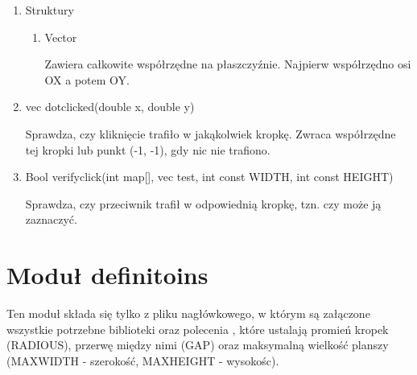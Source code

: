 \documentclass{article}
\begin{document}
\begin{enumerate}

\item Struktury

\begin{enumerate}

\item Vector

Zawiera całkowite współrzędne na płaszczyźnie. Najpierw współrzędno osi OX a potem OY.

\end{enumerate}

\item vec dot\textunderscore clicked(double x, double y)

Sprawdza, czy kliknięcie trafiło w jakąkolwiek kropkę. Zwraca współrzędne tej kropki lub punkt (-1, -1), gdy nic nie trafiono.

\item \textunderscore Bool verify\textunderscore click(int map[], vec test, int const WIDTH, int const HEIGHT)

Sprawdza, czy przeciwnik trafił w odpowiednią kropkę, tzn. czy może ją zaznaczyć.

\end{enumerate}

\section{Moduł definitoins}

Ten moduł składa się tylko z pliku nagłówkowego, w którym są załączone wszystkie potrzebne biblioteki oraz polecenia , które ustalają promień kropek (RADIOUS), przerwę między nimi (GAP) oraz maksymalną wielkość planszy (MAX\textunderscore WIDTH - szerokość, MAX\textunderscore HEIGHT - wysokośc).
\end{document}
